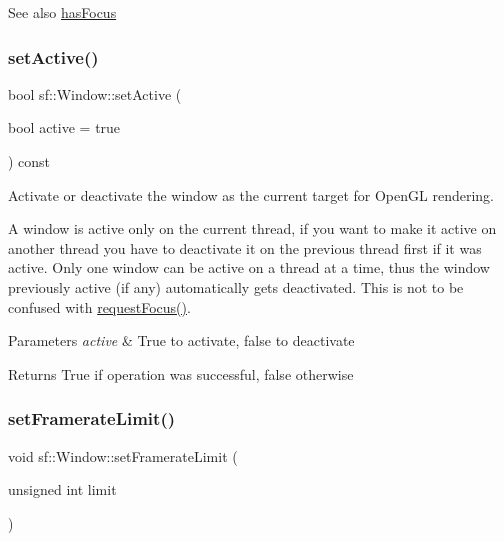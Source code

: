 \begin{DoxySeeAlso}{See also}
\hyperlink{classsf_1_1_window_ad8db2e6500d13ca9396281296404ba31}{has\+Focus} 
\end{DoxySeeAlso}
\mbox{\label{classsf_1_1_window_aaab549da64cedf74fa6f1ae7a3cc79e0}} 
\subsubsection{\texorpdfstring{set\+Active()}{setActive()}}
{\footnotesize\ttfamily bool sf\+::\+Window\+::set\+Active (\begin{DoxyParamCaption}\item[{bool}]{active = {\ttfamily true} }\end{DoxyParamCaption}) const}



Activate or deactivate the window as the current target for Open\+GL rendering. 

A window is active only on the current thread, if you want to make it active on another thread you have to deactivate it on the previous thread first if it was active. Only one window can be active on a thread at a time, thus the window previously active (if any) automatically gets deactivated. This is not to be confused with \hyperlink{classsf_1_1_window_a58cf7fa1775e8e7542032e3ecfa83b49}{request\+Focus()}.


\begin{DoxyParams}{Parameters}
{\em active} & True to activate, false to deactivate\\
\hline
\end{DoxyParams}
\begin{DoxyReturn}{Returns}
True if operation was successful, false otherwise 
\end{DoxyReturn}
\mbox{\label{classsf_1_1_window_af4322d315baf93405bf0d5087ad5e784}} 
\subsubsection{\texorpdfstring{set\+Framerate\+Limit()}{setFramerateLimit()}}
{\footnotesize\ttfamily void sf\+::\+Window\+::set\+Framerate\+Limit (\begin{DoxyParamCaption}\item[{unsigned int}]{limit }\end{DoxyParamCaption})}



